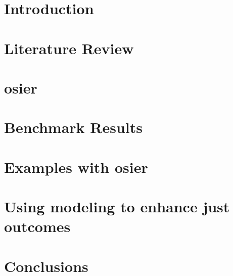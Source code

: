 \chapter{Introduction}






\chapter{Literature Review}
\label{chapter:lit-review}
% 

\chapter{\acf{osier}}
\label{chapter:osier}
% 


\chapter{Benchmark Results}
\label{chapter:benchmark-results}
% 

\chapter{Examples with \acs{osier}}
\label{chapter:examples}
% 

\chapter{Using modeling to enhance just outcomes}
\label{chapter:communities}


\chapter{Conclusions}
